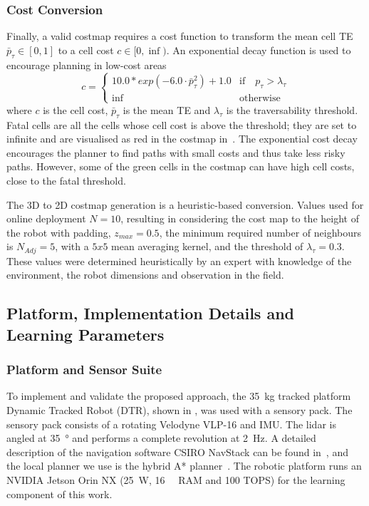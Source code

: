 \subsubsection{Cost Conversion}
Finally, a valid costmap requires a cost function to transform the mean cell \ac{TE} $\bar{p}_\tau \in [0,1]$ to a cell cost $c \in [0,\inf)$. An exponential decay function is used to encourage planning in low-cost areas
\begin{equation}
 \label{eq:2d_cost}
 c = \left\{
 \begin{array}{ll}
 10.0*exp{(-6.0\cdot \bar{p}_\tau^2)} + 1.0 & \textrm{if} \quad p_\tau > \lambda_{\tau} \\
 \inf & \textrm{otherwise}
 \end{array} \right.
\end{equation}
where $c$ is the cell cost, $\bar{p}_\tau$ is the mean \ac{TE} and $\lambda_\tau$ is the traversability threshold. Fatal cells are all the cells whose cell cost is above the threshold; they are set to infinite and are visualised as red in the costmap in~. The exponential cost decay encourages the planner to find paths with small costs and thus take less risky paths. However, some of the green cells in the costmap can have high cell costs, close to the fatal threshold.  

The 3D to 2D costmap generation is a heuristic-based conversion. Values used for online deployment $N=10$, resulting in considering the cost map to the height of the robot with padding, $z_{max} = 0.5$, the minimum required number of neighbours is $N_{Adj} = 5$, with a $5x5$ mean averaging kernel, and the threshold of $\lambda_\tau = 0.3$. These values were determined heuristically by an expert with knowledge of the environment, the robot dimensions and observation in the field.


\subsection{Platform, Implementation Details and Learning Parameters}

\subsubsection{Platform and Sensor Suite}
To implement and validate the proposed approach, the \qty{35}{\kg} tracked platform Dynamic Tracked Robot (DTR),  shown in , was used with a sensory pack. The sensory pack consists of a rotating Velodyne VLP-16 and IMU. The lidar is angled at \qty{35}{\degree} and performs a complete revolution at \qty{2}{\Hz}. A detailed description of the navigation software CSIRO NavStack can be found in~\cite{HudTal21}, and the local planner we use is the hybrid A* planner~\cite{dolgov08}. The robotic platform runs an NVIDIA Jetson Orin NX (\qty{25}{\watt}, \qty{16}{\giga\byte} RAM and 100 TOPS) for the learning component of this work.

